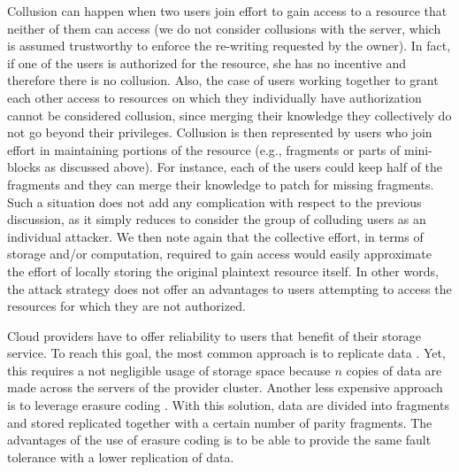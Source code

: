 \medskip
{}
Collusion can happen when two users join effort to gain access to a resource that neither of them can access (we do not consider collusions with the server, which is assumed trustworthy to enforce the re-writing requested by the owner). In fact, if one of the users is authorized for the resource, she has no incentive and therefore there is no collusion. Also, the case of users working together to grant each other access to resources on which they individually have authorization cannot be considered collusion, since merging their knowledge they collectively do not go beyond their privileges. Collusion is then represented by users who join effort in maintaining portions of the resource (e.g., fragments or parts of mini-blocks as discussed above). For instance, each of the users could keep half of the fragments and they can merge their knowledge to patch for missing fragments. Such a situation does not add any complication with respect to the previous discussion, as it simply reduces to consider the group of colluding users as an individual attacker. We then note again that the collective effort, in terms of storage and/or computation, required to gain access would easily approximate the effort of locally storing the original plaintext resource itself. In other words, the attack strategy does not offer an advantages to users attempting to access the resources for which they are not authorized.

\medskip
{}
Cloud providers have to offer reliability to users that benefit of their storage service. To reach this goal, the most common approach is to replicate data \cite{Calder:2011:WAS:2043556.2043571}. Yet, this requires a not negligible usage of storage space because $n$ copies of data are made across the servers of the provider cluster.
Another less expensive approach is to leverage erasure coding \cite{huang2012erasure}. With this solution, data are divided into fragments and stored replicated together with a certain number of parity fragments. The advantages of the use of erasure coding is to be able to provide the same fault tolerance with a lower replication of data.

